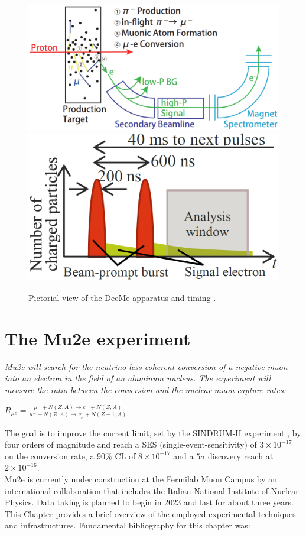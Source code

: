 \documentclass[12pt,a4paper,openright, oneside, titlepage]{book} %
\begin{document}
\begin{figure}[h!]
\centering
\includegraphics[scale=0.4]{DeeMe}
\includegraphics[scale=0.4]{DeeMe_event}
\caption[DeeMe experiment]{Pictorial view of the DeeMe apparatus and timing \cite{DeeMe}. }
\label{_DeeMe}
\end{figure}

\chapter{The Mu2e experiment}
{\itshape 
Mu2e will search for the neutrino-less coherent conversion of a negative muon into an electron
in the field of an aluminum nucleus. The experiment will measure the ratio between the conversion 
and the nuclear muon capture rates:
\begin{center}
$R_{\mu e} = \frac{\mu^- + N(Z, A) \rightarrow e^- + N(Z, A)}
{\mu^- + N(Z,A) \rightarrow \nu_{\mu} + N(Z-1, A)}$
\end{center}
\noindent
The goal is to improve the current limit, set by the SINDRUM-II experiment \cite{SINDRUMII}, by four orders of magnitude and reach a SES (single-event-sensitivity) of $3\times 10^{-17}$ on the conversion rate, a 90\% CL of $8\times 10^{-17}$ and a $5\sigma$ discovery reach at $2\times 10^{-16}$.\\
Mu2e is currently under construction at the Fermilab Muon Campus by an international collaboration that includes the Italian National Institute of Nuclear Physics.
Data taking is planned to begin in 2023 and last for about three years. 
This Chapter provides a brief overview of the employed experimental techniques and infrastructures. Fundamental bibliography for this chapter was: \cite{signorelli} \cite{bob_cflv} \cite{bob_mu2e} \cite{Manolis}}
\end{document}

